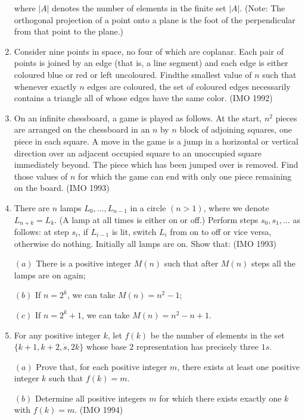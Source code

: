 \begin{enumerate}
 where $|A|$ denotes the number of elements in the finite set $|A|$. (Note: The orthogonal projection of a point onto a plane is the foot of the perpendicular from that point to the plane.)
\item Consider nine points in space, no four of which are coplanar. Each pair of points is joined by an edge (that is, a line segment) and each edge is either coloured blue or red or left uncoloured. Findthe smallest value of $n$ such that whenever exactly $n$ edges are coloured, the set of coloured edges necessarily contains a triangle all of whose edges have the same color. \hfill(IMO 1992)
\item On an infinite chessboard, a game is played as follows. At the start, $n^{2}$ pieces are arranged on the chessboard in an $n$ by $n$ block of adjoining squares, one piece in each square. A move in the game is a jump in a horizontal or vertical direction over an adjacent occupied square to an unoccupied square immediately beyond. The piece which has  been jumped over is removed.                        
 Find those values of $n$ for which the game can end with only one piece remaining on the board.  \hfill(IMO 1993)
\item There are $n$ lamps $L_0, \dots , L_{ n-1 }$  in a circle $(n > 1) $, where we denote $L_{n+k} =  L_k$. (A lamp at all times is either on or off.) Perform steps $s_0, s_1, \dots $ as follows: at step $s_i$, if $L_{i-1}$ is lit, switch $L_i$ from on to off or vice versa, otherwise do nothing. Initially all lamps are on. Show that:            \hfill(IMO 1993)                                                  

$(a)$ There is a positive integer $M(n)$ such that     after $M(n)$ steps all the lamps are on again;                                                           

 $(b)$ If $n = 2^{k}$, we can take $M(n) = n^{2}-1$;                                                          

$(c)$ If $n = 2^{k}+1$, we can take $M(n) = n^{2}-n+1$.   

\item For any positive integer $k$, let $f(k)$ be the number of elements in the set $\{ k+1, k+2, \dot s, 2k \}$ whose base $2$ representation has precisely three $1s$.
 
   $(a)$ Prove that, for each positive integer $m$, there exists at least one positive integer $k$ such that $f(k)=m$.
 
		  $(b)$ Determine all positive integers $m$ for which there exists exactly one $k$ with $f(k)= m$.     \hfill(IMO 1994)
\end{enumerate}
